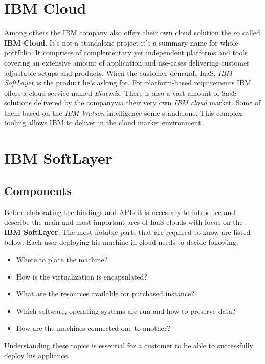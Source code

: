 \chapter{IBM Cloud}
\label{chap:IBM Cloud}

Among others the IBM company also offers their own cloud solution the so called \textbf{IBM Cloud}. It's not a standalone project it's a summary name for whole portfolio. It comprises of complementary yet independent platforms and tools covering an extensive amount of application and use-cases delivering customer adjustable setups and products. When the customer demands IaaS, \emph{IBM SoftLayer} is the product he's asking for. For platform-based requirements IBM offers a cloud service named \emph{Bluemix}. There is also a vast amount of SaaS solutions delivered by the companyvia their very own \emph{IBM cloud} market. Some of them based on the \emph{IBM Watson} intelligence some standalone. This complex tooling allows IBM to deliver in the cloud market environment.

\chapter{IBM SoftLayer}
\label{chap:IBM SoftLayer}

\section{Components}
\label{sec:Components}

Before elaborating the bindings and APIs it is necessary to introduce and describe the main and most important ares of IaaS clouds with focus on the \textbf{IBM SoftLayer}. The most notable parts that are required to know are listed below. Each user deploying his machine in cloud needs to decide following:

\begin{itemize}
	\item Where to place the machine?
	\item How is the virtualization is encapsulated?
	\item What are the resources available for purchased instance?
	\item Which software, operating systems are run and how to preserve data?
	\item How are the machines connected one to another?
\end{itemize}

Understanding these topics is essential for a customer to be able to successfully deploy his appliance.


